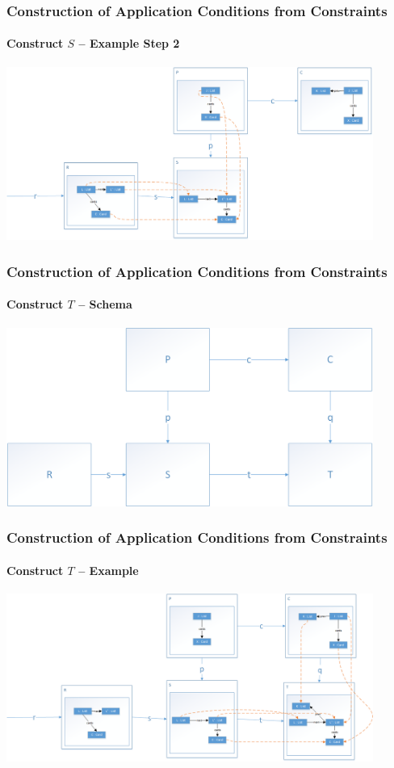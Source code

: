\documentclass[32pt,t]{beamer}
\begin{document}
	\begin{frame}
		\frametitle{Construction of Application Conditions from Constraints}
		\framesubtitle{Construct $S$ -- Example Step 2}
		\centering
		\includegraphics[width=12cm]{Images/12_Construct_S_Example_Step2}
	\end{frame}

	\begin{frame}
		\frametitle{Construction of Application Conditions from Constraints}
		\framesubtitle{Construct $T$ -- Schema}
		\centering
		\includegraphics[width=12cm]{Images/20_Construct_T_Schema}
	\end{frame}

	\begin{frame}
		\frametitle{Construction of Application Conditions from Constraints}
		\framesubtitle{Construct $T$ -- Example}
		\centering
		\includegraphics[width=12cm]{Images/21_Construct_T_Example}
	\end{frame}
\end{document}
